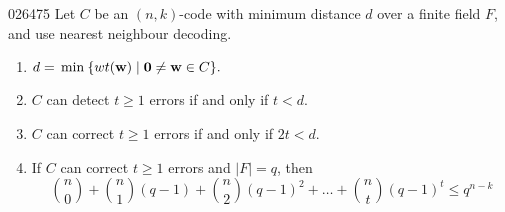 \begin{theorem}{}{026475}
Let $C$ be an $(n, k)$-code with minimum distance $d$ over a finite field $F$, and use nearest neighbour decoding.

\begin{enumerate}
\item $d = \thinspace\operatorname{min\medspace} \{ wt(\textbf{w}) \mid \textbf{0} \neq \textbf{w} \in C\}.$

\item $C$ can detect $t \geq 1$ errors if and only if $t < d$.

\item $C$ can correct $t \geq 1$ errors if and only if $2t < d$.

\item If $C$ can correct $t \geq 1$ errors and $|F| = q$, then
\begin{equation*}
\textstyle \binom{n}{0} + \binom{n}{1}(q - 1) + \binom{n}{2}(q - 1)^2 + \dots + \binom{n}{t}(q - 1)^t \le q^{n-k}
\end{equation*}
\end{enumerate}
\vspace*{0.25em}
\end{theorem}

